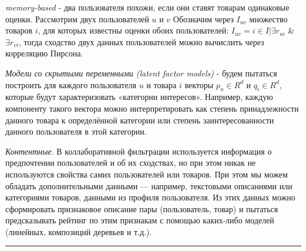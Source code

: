 \documentclass[11pt]{article}
\begin{document}
\emph{memory-based} - два пользователя похожи, если они ставят товарам
одинаковые оценки. Рассмотрим двух пользователей \(u\) и \(v\) Обозначим
через \(I_{uv}\) множество товаров \(i\), для которых известны оценки
обоих пользователей: \(I_{uv} = i ∈ I | ∃ r_{ui}\) \& \(∃ r_{vi}\),
тогда сходство двух данных пользователей можно вычислить через
корреляцию Пирсона.

\emph{Модели со скрытыми переменными (latent factor models)} - будем
пытаться построить для каждого пользователя \(u\) и товара \(i\) векторы
\(p_u ∈ R^d\) и \(q_i ∈ R^d\), которые будут характеризовать «категории
интересов». Например, каждую компоненту такого вектора можно
интерпретировать как степень принадлежности данного товара к
определённой категории или степень заинтересованности данного
пользователя в этой категории.

\emph{Контентные}. В коллаборативной фильтрации используется информация
о предпочтении пользователей и об их сходствах, но при этом никак не
используются свойства самих пользователей или товаров. При этом мы можем
обладать дополнительными данными --- например, текстовыми описаниями или
категориями товаров, данными из профиля пользователя. Из этих данных
можно сформировать признаковое описание пары (пользователь, товар) и
пытаться предсказывать рейтинг по этим признакам с помощью каких-либо
моделей (линейных, композиций деревьев и т.д.).

    \begin{center}\rule{0.5\linewidth}{\linethickness}\end{center}


    
    
    
    
\end{document}
